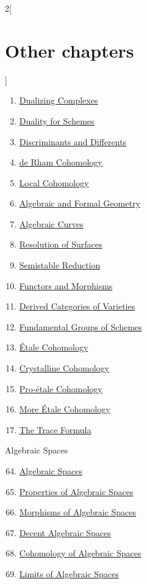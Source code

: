 \begin{multicols}{2}[\section{Other chapters}]
\begin{enumerate}
\item \hyperref[dualizing-section-phantom]{Dualizing Complexes}
\item \hyperref[duality-section-phantom]{Duality for Schemes}
\item \hyperref[discriminant-section-phantom]{Discriminants and Differents}
\item \hyperref[derham-section-phantom]{de Rham Cohomology}
\item \hyperref[local-cohomology-section-phantom]{Local Cohomology}
\item \hyperref[algebraization-section-phantom]{Algebraic and Formal Geometry}
\item \hyperref[curves-section-phantom]{Algebraic Curves}
\item \hyperref[resolve-section-phantom]{Resolution of Surfaces}
\item \hyperref[models-section-phantom]{Semistable Reduction}
\item \hyperref[functors-section-phantom]{Functors and Morphisms}
\item \hyperref[equiv-section-phantom]{Derived Categories of Varieties}
\item \hyperref[pione-section-phantom]{Fundamental Groups of Schemes}
\item \hyperref[etale-cohomology-section-phantom]{\'Etale Cohomology}
\item \hyperref[crystalline-section-phantom]{Crystalline Cohomology}
\item \hyperref[proetale-section-phantom]{Pro-\'etale Cohomology}
\item \hyperref[more-etale-section-phantom]{More \'Etale Cohomology}
\item \hyperref[trace-section-phantom]{The Trace Formula}
\end{enumerate}
Algebraic Spaces
\begin{enumerate}
\setcounter{enumi}{63}
\item \hyperref[spaces-section-phantom]{Algebraic Spaces}
\item \hyperref[spaces-properties-section-phantom]{Properties of Algebraic Spaces}
\item \hyperref[spaces-morphisms-section-phantom]{Morphisms of Algebraic Spaces}
\item \hyperref[decent-spaces-section-phantom]{Decent Algebraic Spaces}
\item \hyperref[spaces-cohomology-section-phantom]{Cohomology of Algebraic Spaces}
\item \hyperref[spaces-limits-section-phantom]{Limits of Algebraic Spaces}

\end{enumerate}
\end{multicols}
